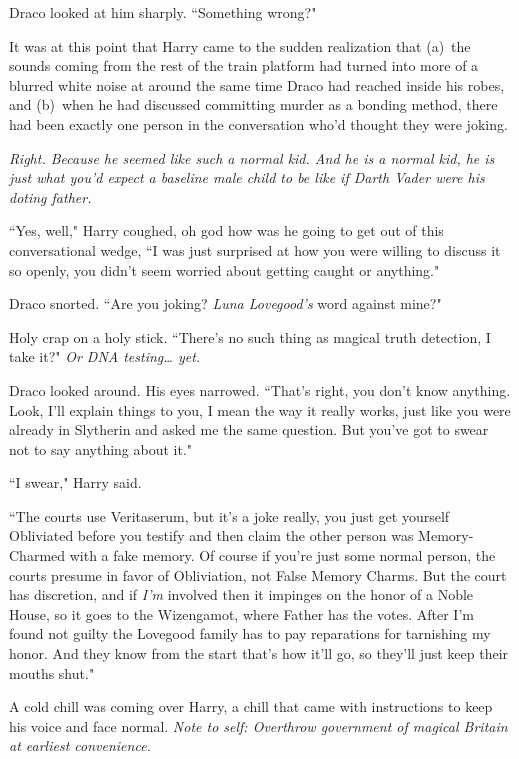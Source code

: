 Draco looked at him sharply. ``Something wrong?"

It was at this point that Harry came to the sudden realization that (a)~the sounds coming from the rest of the train platform had turned into more of a blurred white noise at around the same time Draco had reached inside his robes, and (b)~when he had discussed committing murder as a bonding method, there had been exactly one person in the conversation who'd thought they were joking.

\emph{Right. Because he \emph{seemed} like such a normal kid. And he \emph{is} a normal kid, he is just what you'd \emph{expect} a baseline male child to be like if Darth Vader were his doting father.}

``Yes, well," Harry coughed, oh god how was he going to get out of this conversational wedge, ``I was just surprised at how you were willing to discuss it so openly, you didn't seem worried about getting caught or anything."

Draco snorted. ``Are you joking? \emph{Luna Lovegood's} word against mine?"

Holy crap on a holy stick. ``There's no such thing as magical truth detection, I take it?" \emph{Or DNA testing{\ldots} yet.}

Draco looked around. His eyes narrowed. ``That's right, you don't know anything. Look, I'll explain things to you, I mean the way it really works, just like you were already in Slytherin and asked me the same question. But you've got to swear not to say anything about it."

``I swear," Harry said.

``The courts use Veritaserum, but it's a joke really, you just get yourself Obliviated before you testify and then claim the other person was Memory-Charmed with a fake memory. Of course if you're just some normal person, the courts presume in favor of Obliviation, not False Memory Charms. But the court has discretion, and if \emph{I'm} involved then it impinges on the honor of a Noble House, so it goes to the Wizengamot, where Father has the votes. After I'm found not guilty the Lovegood family has to pay reparations for tarnishing my honor. And they know from the start that's how it'll go, so they'll just keep their mouths shut."

A cold chill was coming over Harry, a chill that came with instructions to keep his voice and face normal. \emph{Note to self: Overthrow government of magical Britain at earliest convenience.}

